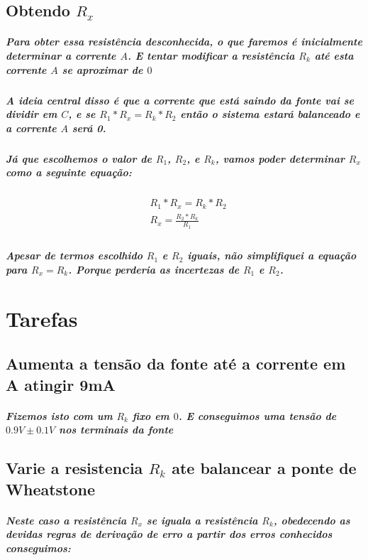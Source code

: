 \documentclass[12pt,twoside, a4paper, twocolumn]{article}
\begin{document}
\subsection{Obtendo $R_x$}

\subparagraph*{Para obter essa resistência desconhecida, o que faremos é inicialmente determinar a corrente $A$. E tentar modificar a resistência $R_k$ até esta corrente $A$ se aproximar de $0$}

\subparagraph*{A ideia central disso é que a corrente que está saindo da fonte vai se dividir em $C$, e se $R_1 * R_x = R_k * R_2$ então o sistema estará balanceado e a corrente $A$ será 0.}

\subparagraph*{Já que escolhemos o valor de $R_1$, $R_2$, e $R_k$, vamos poder determinar $R_x$ como a seguinte equação:}


\begin{equation}
    \begin{aligned}
         & R_1 * R_x  = R_k * R_2       \\
         & R_x = \frac{R_2 * R_k}{R_1 } \\
    \end{aligned}
\end{equation}

\subparagraph*{Apesar de termos escolhido $R_1$ e $R_2$ iguais, não simplifiquei a equação para $R_x = R_k$. Porque perderia as incertezas de $R_1$ e $R_2$. }




\section{Tarefas}

\subsection{Aumenta a tensão da fonte até a corrente em A atingir 9mA}

\subparagraph*{Fizemos isto com um $R_k$ fixo em $0$. E conseguimos uma tensão de $0.9V \pm 0.1V$ nos terminais da fonte}

\subsection{Varie a resistencia $R_k$ ate balancear a ponte de Wheatstone}

\subparagraph*{Neste caso a resistência $R_x$ se iguala a resistência $R_k$, obedecendo as devidas regras de derivação de erro a partir dos erros conhecidos conseguimos:}
\end{document}
